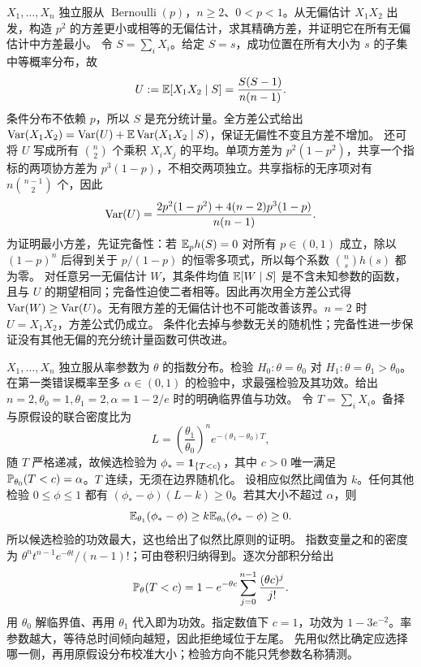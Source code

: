 $X_1,\ldots,X_n$ 独立服从 $\operatorname{Bernoulli}(p)$，$n\ge2$、$0<p<1$。从无偏估计 $X_1X_2$ 出发，构造 $p^2$ 的方差更小或相等的无偏估计，求其精确方差，并证明它在所有无偏估计中方差最小。
\solution 令 $S=\sum_iX_i$。给定 $S=s$，成功位置在所有大小为 $s$ 的子集中等概率分布，故
\[
 U:=\mathbb{E}[X_1X_2\mid S]=\frac{S(S-1)}{n(n-1)}.
\]
条件分布不依赖 $p$，所以 $S$ 是充分统计量。全方差公式给出 $\operatorname{Var}(X_1X_2)=\operatorname{Var}(U)+\mathbb{E}\operatorname{Var}(X_1X_2\mid S)$，保证无偏性不变且方差不增加。
还可将 $U$ 写成所有 $\binom n2$ 个乘积 $X_iX_j$ 的平均。单项方差为 $p^2(1-p^2)$，共享一个指标的两项协方差为 $p^3(1-p)$，不相交两项独立。共享指标的无序项对有 $n\binom{n-1}{2}$ 个，因此
\[
 \operatorname{Var}(U)=\frac{2p^2(1-p^2)+4(n-2)p^3(1-p)}{n(n-1)}.
\]
为证明最小方差，先证完备性：若 $\mathbb{E}_p h(S)=0$ 对所有 $p\in(0,1)$ 成立，除以 $(1-p)^n$ 后得到关于 $p/(1-p)$ 的恒零多项式，所以每个系数 $\binom ns h(s)$ 都为零。
对任意另一无偏估计 $W$，其条件均值 $\mathbb{E}[W\mid S]$ 是不含未知参数的函数，且与 $U$ 的期望相同；完备性迫使二者相等。因此再次用全方差公式得 $\operatorname{Var}(W)\ge\operatorname{Var}(U)$。无有限方差的无偏估计也不可能改善该界。$n=2$ 时 $U=X_1X_2$，方差公式仍成立。
\insight 条件化去掉与参数无关的随机性；完备性进一步保证没有其他无偏的充分统计量函数可供改进。

$X_1,\ldots,X_n$ 独立服从率参数为 $\theta$ 的指数分布。检验 $H_0:\theta=\theta_0$ 对 $H_1:\theta=\theta_1>\theta_0$。在第一类错误概率至多 $\alpha\in(0,1)$ 的检验中，求最强检验及其功效。给出 $n=2,\theta_0=1,\theta_1=2,\alpha=1-2/e$ 时的明确临界值与功效。
\solution 令 $T=\sum_iX_i$。备择与原假设的联合密度比为
\[
 L=\left(\frac{\theta_1}{\theta_0}\right)^n
      e^{-(\theta_1-\theta_0)T},
\]
随 $T$ 严格递减，故候选检验为 $\phi_*=\mathbf{1}_{\{T<c\}}$，其中 $c>0$ 唯一满足 $\mathbb{P}_{\theta_0}(T<c)=\alpha$。$T$ 连续，无须在边界随机化。
设相应似然比阈值为 $k$。任何其他检验 $0\le\phi\le1$ 都有 $(\phi_* -\phi)(L-k)\ge0$。若其大小不超过 $\alpha$，则
\[
 \mathbb{E}_{\theta_1}(\phi_* -\phi)
 \ge k\mathbb{E}_{\theta_0}(\phi_* -\phi)\ge0.
\]
所以候选检验的功效最大，这也给出了似然比原则的证明。
指数变量之和的密度为 $\theta^nt^{n-1}e^{-\theta t}/(n-1)!$；可由卷积归纳得到。逐次分部积分给出
\[
 \mathbb{P}_\theta(T<c)=1-e^{-\theta c}
       \sum_{j=0}^{n-1}\frac{(\theta c)^j}{j!}.
\]
用 $\theta_0$ 解临界值、再用 $\theta_1$ 代入即为功效。指定数值下 $c=1$，功效为 $1-3e^{-2}$。率参数越大，等待总时间倾向越短，因此拒绝域位于左尾。
\insight 先用似然比确定应选择哪一侧，再用原假设分布校准大小；检验方向不能只凭参数名称猜测。

